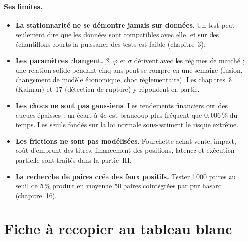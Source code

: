 \documentclass[11pt,a4paper]{article}
\begin{document}
\paragraph{Ses limites.}
\begin{itemize}
\item \textbf{La stationnarité ne se démontre jamais sur données.} Un test peut seulement dire que les données sont compatibles avec elle, et sur des échantillons courts la puissance des tests est faible (chapitre~3).
\item \textbf{Les paramètres changent.} $\beta$, $\varphi$ et $\sigma$ dérivent avec les régimes de marché ; une relation solide pendant cinq ans peut se rompre en une semaine (fusion, changement de modèle économique, choc réglementaire). Les chapitres~8 (Kalman) et~17 (détection de rupture) y répondent en partie.
\item \textbf{Les chocs ne sont pas gaussiens.} Les rendements financiers ont des queues épaisses : un écart à $4\sigma$ est beaucoup plus fréquent que $0{,}006\,\%$ du temps. Les seuils fondés sur la loi normale sous-estiment le risque extrême.
\item \textbf{Les frictions ne sont pas modélisées.} Fourchette achat-vente, impact, coût d'emprunt des titres, financement des positions, latence et exécution partielle sont traités dans la partie~III.
\item \textbf{La recherche de paires crée des faux positifs.} Tester 1\,000 paires au seuil de 5\,\% produit en moyenne 50 \og paires cointégrées\fg{} par pur hasard (chapitre~16).
\end{itemize}

\section{Fiche à recopier au tableau blanc}
\end{document}
